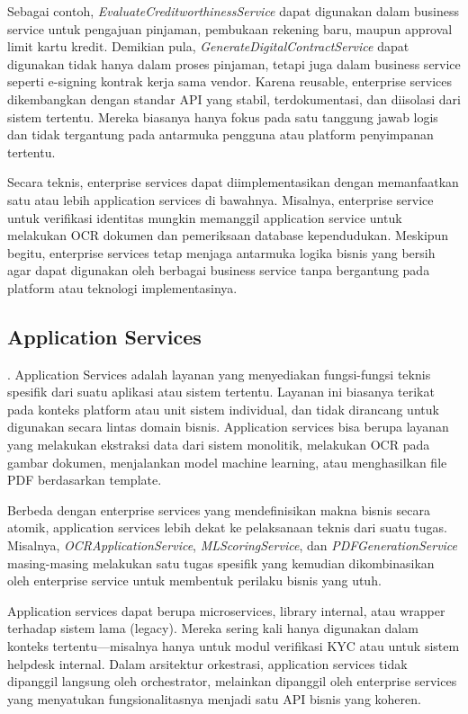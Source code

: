 Sebagai contoh, \textit{EvaluateCreditworthinessService} dapat digunakan dalam business service untuk pengajuan pinjaman, pembukaan rekening baru, maupun approval limit kartu kredit. Demikian pula, \textit{GenerateDigitalContractService} dapat digunakan tidak hanya dalam proses pinjaman, tetapi juga dalam business service seperti e-signing kontrak kerja sama vendor. Karena reusable, enterprise services dikembangkan dengan standar API yang stabil, terdokumentasi, dan diisolasi dari sistem tertentu. Mereka biasanya hanya fokus pada satu tanggung jawab logis dan tidak tergantung pada antarmuka pengguna atau platform penyimpanan tertentu.

Secara teknis, enterprise services dapat diimplementasikan dengan memanfaatkan satu atau lebih application services di bawahnya. Misalnya, enterprise service untuk verifikasi identitas mungkin memanggil application service untuk melakukan OCR dokumen dan pemeriksaan database kependudukan. Meskipun begitu, enterprise services tetap menjaga antarmuka logika bisnis yang bersih agar dapat digunakan oleh berbagai business service tanpa bergantung pada platform atau teknologi implementasinya.

\subsection{Application Services}. 
Application Services adalah layanan yang menyediakan fungsi-fungsi teknis spesifik dari suatu aplikasi atau sistem tertentu. Layanan ini biasanya terikat pada konteks platform atau unit sistem individual, dan tidak dirancang untuk digunakan secara lintas domain bisnis. Application services bisa berupa layanan yang melakukan ekstraksi data dari sistem monolitik, melakukan OCR pada gambar dokumen, menjalankan model machine learning, atau menghasilkan file PDF berdasarkan template.

Berbeda dengan enterprise services yang mendefinisikan makna bisnis secara atomik, application services lebih dekat ke pelaksanaan teknis dari suatu tugas. Misalnya, \textit{OCRApplicationService}, \textit{MLScoringService}, dan \textit{PDFGenerationService} masing-masing melakukan satu tugas spesifik yang kemudian dikombinasikan oleh enterprise service untuk membentuk perilaku bisnis yang utuh.

Application services dapat berupa microservices, library internal, atau wrapper terhadap sistem lama (legacy). Mereka sering kali hanya digunakan dalam konteks tertentu—misalnya hanya untuk modul verifikasi KYC atau untuk sistem helpdesk internal. Dalam arsitektur orkestrasi, application services tidak dipanggil langsung oleh orchestrator, melainkan dipanggil oleh enterprise services yang menyatukan fungsionalitasnya menjadi satu API bisnis yang koheren.


